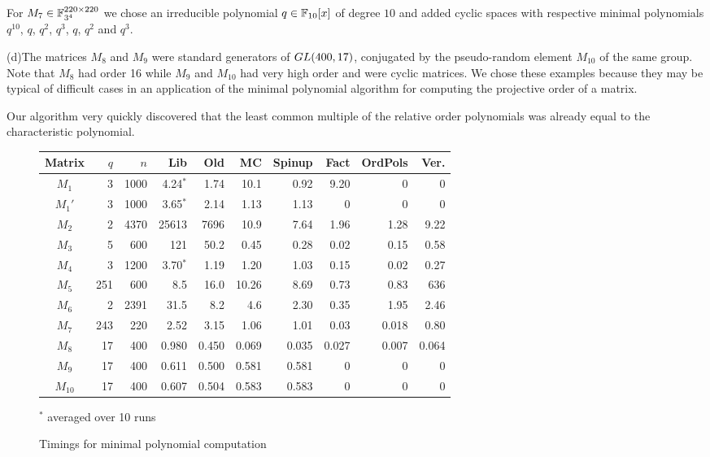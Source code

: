 For $M_7 \in \mathbb{F}_{3^4}^{220 \times 220}$ we chose an irreducible polynomial
$q \in \mathbb{F}_{10}[x]$ of degree $10$ and added cyclic spaces with
respective minimal polynomials $q^{10}$, $q$, $q^2$, $q^3$, $q$, $q^2$ and
$q^3$.

(d)\quad The matrices $M_8$ and $M_9$ were standard generators of 
${\rm GL}(400,17)$, 
conjugated by the pseu\-do-random element $M_{10}$ of the same group.
Note that $M_8$ had
order 16 while $M_9$ and $M_{10}$ had very high order and were cyclic 
matrices. We chose these examples because they may be typical of 
difficult cases in an application of the minimal polynomial algorithm
for computing the projective order of a matrix. 

Our algorithm %
very quickly discovered that the least common multiple of the relative order
polynomials was already equal to the characteristic polynomial.

\begin{figure}
\caption{Timings for minimal polynomial computation}
\label{timings}
\begin{center}
\begin{tabular}{|c|r|r|r|r|r|r|r|r|r|}
\hline
Matrix & $q$ & $n$ & Lib & Old & MC & Spinup & Fact & OrdPols & Ver. \\
\hline
\hline
$M_1$  & 3   & 1000 & 4.24$^*$ & 1.74 & 10.1 & 0.92 & 9.20 & 0 & 0 \\
$M_1'$ & 3   & 1000 & 3.65$^*$ & 2.14 & 1.13 & 1.13 & 0 & 0 & 0 \\
$M_2$  & 2   & 4370 & 25613 & 7696 & 10.9 & 7.64 & 1.96 & 1.28 & 9.22 \\
$M_3$  & 5   &  600 & 121 & 50.2 & 0.45 & 0.28 & 0.02 & 0.15 & 0.58 \\
$M_4$  & 3   & 1200 & 3.70$^*$& 1.19 & 1.20 & 1.03 & 0.15 & 0.02 & 0.27 \\
$M_5$  & 251 &  600 & 8.5 &16.0& 10.26 & 8.69 & 0.73 & 0.83 & 636 \\ 
$M_6$  & 2   & 2391 & 31.5& 8.2& 4.6  & 2.30 & 0.35 & 1.95 & 2.46 \\
$M_7$  & 243 &  220 & 2.52 & 3.15& 1.06 & 1.01 & 0.03 & 0.018 & 0.80 \\
$M_8$  & 17  &  400 & 0.980 & 0.450  & 0.069 & 0.035 & 0.027 & 0.007 & 0.064 \\
$M_9$  & 17  &  400 & 0.611 & 0.500 & 0.581 & 0.581 & 0 & 0 & 0 \\
$M_{10}$& 17  &  400 & 0.607 & 0.504 & 0.583 & 0.583 & 0 & 0 & 0 \\
\hline
\end{tabular}

\medskip
$^*$ averaged over 10 runs
\end{center}
\end{figure}

